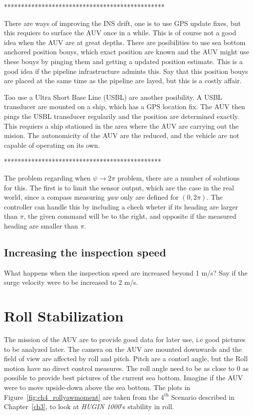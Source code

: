 	***********************************************

	There are ways of improving the INS drift, one is to use GPS update fixes, but this requiers to
	surface the AUV once in a while. This is of course not a good idea when the AUV are at great depths.
	There are posibilities to use sea bottom anchored position bouys, which exact position are known and
	the AUV might use these bouys by pinging them and getting a updated position estimate. This is a good
	idea if the pipeline infrastructure admints this. Say that this position bouys are placed at the same
	time as the pipeline are layed, but this is a costly affair. 

	Too use a Ultra Short Base Line (USBL) are another posibility. A USBL transducer are mounted on a
	ship, which has a GPS location fix. The AUV then pings the USBL transducer regularily and the position
	are determined exactly. This requiers a ship stationed in the area where the AUV are carrying out the
	mision. The autonomicity of the AUV are the reduced, and the vehicle are not capable of operating on
	its own. 

	**********************************************

	The problem regarding when $\psi \rightarrow 2\pi$ problem, there are a number of solutions for this.
	The first is to limit the sensor output, which are the case in the real world, since a compass
	measuring \textit{yaw} only are defined for $(0, 2 \pi)$. The controller can handle this by including
	a chech wheter if its heading are larger than $\pi$, the given command will be to the right, and
	opposite if the measured heading are smaller than $\pi$.

	\subsection{Increasing the inspection speed}
		What happens when the inspection speed are increased beyond 1 m/s? Say if the surge velocity
		were to be increased to 2 m/s. 




\section{Roll Stabilization}
	The mission of the AUV are to provide good data for later use, i.e good pictures to be analyzed later.
	The camera on the AUV are mounted downwards and the field of view are affected by roll and pitch.
	Pitch are a contorl angle, but the Roll motion have no direct control measures. The roll angle need to
	be as close to 0 as possible to provide best pictures of the current sea bottom. Imagine if the AUV
	were to move upside-down above the sea bottom. The plots in Figure~\ref{fig:ch4_rollyawmoment}
	are taken from the $4^{\mathrm{th}}$ Scenario described in Chapter~\ref{ch3}, to look at \textit{HUGIN
	1000}'s stability in roll.
	
